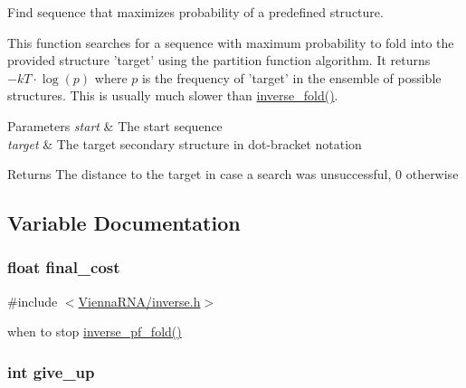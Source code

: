 Find sequence that maximizes probability of a predefined structure. 

This function searches for a sequence with maximum probability to fold into the provided structure 'target' using the partition function algorithm. It returns $-kT \cdot \log(p)$ where $p$ is the frequency of 'target' in the ensemble of possible structures. This is usually much slower than \hyperlink{group__inverse__fold_ga7af026de55d4babad879f2c92559cbbc}{inverse\-\_\-fold()}.


\begin{DoxyParams}{Parameters}
{\em start} & The start sequence \\
\hline
{\em target} & The target secondary structure in dot-\/bracket notation \\
\hline
\end{DoxyParams}
\begin{DoxyReturn}{Returns}
The distance to the target in case a search was unsuccessful, 0 otherwise 
\end{DoxyReturn}


\subsection{Variable Documentation}
\hypertarget{group__inverse__fold_ga7f17d3b169af048d32bb185039a9c09c}{
\subsubsection[{final\-\_\-cost}]{\setlength{\rightskip}{0pt plus 5cm}float final\-\_\-cost}}\label{group__inverse__fold_ga7f17d3b169af048d32bb185039a9c09c}


{\ttfamily \#include $<$\hyperlink{inverse_8h}{Vienna\-R\-N\-A/inverse.\-h}$>$}

when to stop \hyperlink{group__inverse__fold_gaeef52ecbf2a2450ad585a344f9826806}{inverse\-\_\-pf\-\_\-fold()} \hypertarget{group__inverse__fold_ga7ec4ba51f86e1717a1e174264e4a75ce}{
\subsubsection[{give\-\_\-up}]{\setlength{\rightskip}{0pt plus 5cm}int give\-\_\-up}}\label{group__inverse__fold_ga7ec4ba51f86e1717a1e174264e4a75ce}


